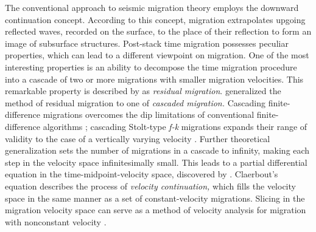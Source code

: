 \begin{comment}
Migration velocity analysis is a routine part of prestack time
migration applications. It serves both as a tool for velocity
estimation \cite[]{FBR08-06-02240234} and as a tool for optimal stacking
of migrated seismic sections and modeling zero-offset data for depth
migration \cite[]{GEO62-02-05680576}. In the most common form, migration
velocity analysis amounts to residual moveout correction on CRP
(common reflection point) gathers. However, in the case of dipping
reflectors, this correction does not provide optimal focusing of
reflection energy, since it does not account for lateral movement of
reflectors caused by the change in migration velocity. In other words,
different points on a stacking hyperbola in a CRP gather can
correspond to different reflection points at the actual reflector. The
situation is similar to that of the conventional NMO velocity
analysis, where the reflection point dispersal problem is usually
overcome with the help of DMO \cite[]{FBR04-07-00070024,dmo}. An
analogous correction is required for optimal focusing in the
post-migration domain. In this paper, I propose and test velocity
continuation as a method of migration velocity analysis. The method
enhances the conventional residual moveout correction by taking into
account lateral movements of migrated reflection events.
\end{comment}

The conventional approach to seismic migration theory
\cite[]{Claerbout.blackwell.85,Berkhout.mig.14A.1985} employs the
downward continuation concept. According to this concept, migration
extrapolates upgoing reflected waves, recorded on the surface, to the
place of their reflection to form an image of subsurface
structures.
Post-stack time migration possesses peculiar properties, which can
lead to a different viewpoint on migration.  One of the most
interesting properties is an ability to decompose the time migration
procedure into a cascade of two or more migrations with smaller
migration velocities. This remarkable property is described by
\cite{GEO50-01-01100126} as {\em residual migration}.
\cite{GEO52-05-06180643} generalized the method of residual
migration to one of {\em cascaded migration.} Cascading
finite-difference migrations overcomes the dip limitations of
conventional finite-difference algorithms \cite[]{GEO52-05-06180643};
cascading Stolt-type {\em f-k} migrations expands their range of
validity to the case of a vertically varying velocity
\cite[]{GEO53-07-08810893}. Further theoretical generalization sets
the number of migrations in a cascade to infinity, making each step in
the velocity space infinitesimally small. This leads to a partial
differential equation in the time-midpoint-velocity space, discovered
by \cite{Claerbout.sep.48.79}. Claerbout's equation describes the
process of {\em velocity continuation,} which fills the velocity space
in the same manner as a set of constant-velocity migrations. Slicing
in the migration velocity space can serve as a method of velocity
analysis for migration with nonconstant velocity
\cite[]{shurtleff,SEG-1984-S1.8,Fowler.sepphd.58, GEO57-01-00510059}.

